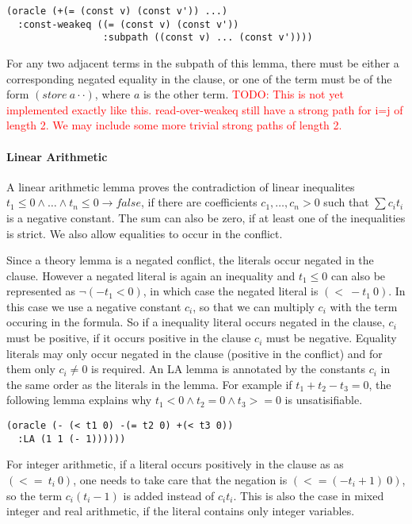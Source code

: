\documentclass[a4paper]{article}
\newcommand\todo[1]{\textcolor{red}{TODO: #1}}
\begin{document}
\begin{verbatim}
(oracle (+(= (const v) (const v')) ...)
  :const-weakeq ((= (const v) (const v'))
                 :subpath ((const v) ... (const v'))))
\end{verbatim}
For any two adjacent terms in the subpath of this lemma, there must be either
a corresponding negated equality in the clause, or one of the term must be of
the form $(store\ a \cdot \cdot)$, where $a$ is the other term.
\todo{This is not yet implemented exactly like this.  read-over-weakeq
  still have a strong path for i=j of length 2.  We may include some more
  trivial strong paths of length 2.}


\paragraph{Linear Arithmetic}

A linear arithmetic lemma proves the contradiction of linear
inequalites $t_1\leq 0\land \dots\land t_n\leq 0 \rightarrow false$, if
there are coefficients $c_1,\dots,c_n > 0$ such that $\sum c_it_i$ is
a negative constant.  The sum can also be zero, if at least one of the
inequalities is strict.  We also allow equalities to occur in the
conflict.

Since a theory lemma is a negated conflict, the literals occur negated
in the clause.  However a negated literal is again an inequality and
$t_1\leq 0$ can also be represented as $\neg (-t_1 <0)$, in which case
the negated literal is $(<\ -t_1\ 0)$.  In this case we use a negative
constant $c_i$, so that we can multiply $c_i$ with the term occuring
in the formula.  So if a inequality literal occurs negated in the
clause, $c_i$ must be positive, if it occurs positive in the clause
$c_i$ must be negative.  Equality literals may only occur negated in
the clause (positive in the conflict) and for them only $c_i\neq 0$ is
required.  An LA lemma is annotated by the constants $c_i$ in the same
order as the literals in the lemma.  For example if $t_1 + t_2 - t_3 =
0$, the following lemma explains why $t_1 < 0 \land t_2 = 0 \land t_3
>= 0$ is unsatisifiable.
\begin{verbatim}
(oracle (- (< t1 0) -(= t2 0) +(< t3 0))
  :LA (1 1 (- 1))))))
\end{verbatim}

For integer arithmetic, if a literal occurs positively in the clause as
as $(<=\ t_i\ 0)$, one needs to take care that the negation is
$(<= (-t_i+1)\ 0)$, so the term $c_i(t_i - 1)$ is added instead
of $c_i t_i$.  This is also the case in mixed integer and real arithmetic,
if the literal contains only integer variables.
\end{document}
